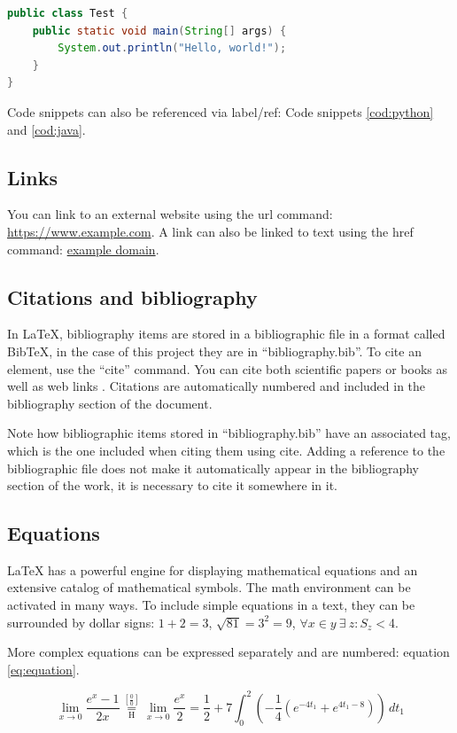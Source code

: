 \begin{lstlisting}[language=Java, caption={Java code}, label={cod:java}, captionpos=b]
public class Test {
    public static void main(String[] args) {
        System.out.println("Hello, world!");
    }
}
\end{lstlisting}

Code snippets can also be referenced via label/ref: Code snippets \ref{cod:python} and \ref{cod:java}.

\subsection{Links}
You can link to an external website using the url command: \url{https://www.example.com}. A link can also be linked to text using the href command: \href{https://www.example.com}{example domain}.

\subsection{Citations and bibliography}
In LaTeX, bibliography items are stored in a bibliographic file in a format called BibTeX, in the case of this project they are in ``bibliography.bib''. To cite an element, use the ``cite'' command. You can cite both scientific papers \cite{berners1994} or books \cite{swales1994} as well as web links \cite{webETSII}. Citations are automatically numbered and included in the bibliography section of the document.

Note how bibliographic items stored in ``bibliography.bib'' have an associated tag, which is the one included when citing them using cite. Adding a reference to the bibliographic file does not make it automatically appear in the bibliography section of the work, it is necessary to cite it somewhere in it.

\subsection{Equations}
LaTeX has a powerful engine for displaying mathematical equations and an extensive catalog of mathematical symbols. The math environment can be activated in many ways. To include simple equations in a text, they can be surrounded by dollar signs: $1 + 2 = 3$, $\sqrt{81} = 3^2 = 9$, $\forall x \in y~\exists~z : S_z < $4.

More complex equations can be expressed separately and are numbered: equation \ref{eq:equation}.

\begin{equation}\label{eq:equation}
\lim_{x\to 0}{\frac{e^x-1}{2x}}
 \overset{\left[\frac{0}{0}\right]}{\underset{\mathrm{H}}{=}}
 \lim_{x\to 0}{\frac{e^x}{2}}={\frac{1}{2}}
 +7 \int_0^2
  \left(
    -\frac{1}{4}\left(e^{-4t_1}+e^{4t_1-8}\right)
  \right)\,dt_1
\end{equation}

